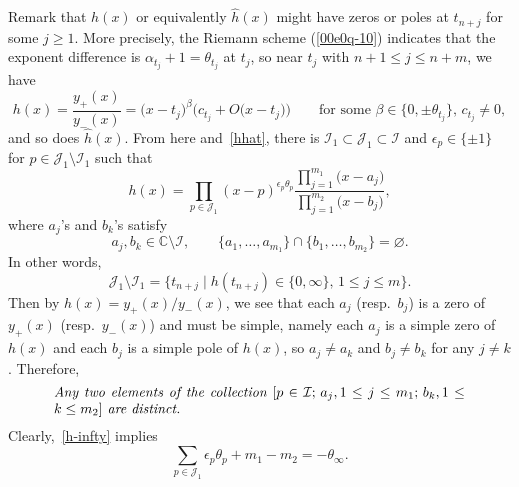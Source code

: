 \documentclass[pdftex]{sigma}
\numberwithin{equation}{section}
\begin{document}
Remark that $h(x)$ or equivalently $\hat{h}(x)$ might have zeros or
poles at $t_{n+j}$ for some $j\geq 1$. More precisely, the Riemann
scheme (\ref{00e0q-10}) indicates that the exponent difference is
$\alpha_{t_j}+1=\theta_{t_j}$ at $t_j$, so near $t_j$ with $n+1\leq
j\leq n+m$, we have
\[h(x)=\frac{y_{+}(x)}{y_{-}(x)}=\bigl(x-t_j\bigr)^{\beta}\bigl(c_{t_j}+O\bigl(x-t_j\bigr)\bigr) \qquad \text{for some $\beta\in\bigl\{0,\pm \theta_{t_j}\bigr\}$, $c_{t_j}\neq 0$},\]
and so does $\hat{h}(x)$. From here and~\eqref{hhat}, there is $\mathcal{I}_1\subset \mathcal{J}_1\subset \mathcal{I}$ and $\epsilon_p\in \{\pm 1\}$ for $p\in \mathcal{J}_1\setminus\mathcal{I}_1$ such that
\begin{equation}\label{00e0q-9}
h(x)=\prod_{p\in \mathcal{J}_1}(x-p)^{\epsilon_{p}\theta_{p}}
\frac{\prod_{j=1}^{m_1}\bigl(x-a_j\bigr)}{\prod_{j=1}^{m_2}\bigl(x-b_j\bigr)},
\end{equation}
where $a_j$'s and $b_k$'s satisfy
\begin{equation*}%
 a_j, b_k\in\mathbb{C}\setminus\mathcal{I},\qquad
 \{a_1,\dots, a_{m_1}\}\cap\{b_1,\dots, b_{m_2}\}=\varnothing.
\end{equation*}
In other words,
\[\mathcal{J}_1\setminus\mathcal{I}_1=\{t_{n+j}\mid h(t_{n+j})\in\{0,\infty\},\, 1\leq j\leq m\}.\]
Then by $h(x)=y_{+}(x)/y_{-}(x)$, we see that each $a_j$ (resp.\ $b_j$)
is a zero of $y_+(x)$ (resp.\ $y_-(x)$) and must be simple, namely each
$a_j$ is a simple zero of $h(x)$ and each $b_j$ is a simple pole of
$h(x)$, so $a_j\neq a_k$ and $b_j\neq b_k$ for any $j\neq
k$. Therefore,
\begin{equation*} %
 \parbox{\dimexpr\linewidth-5em}{\it
 Any two elements of the collection $[p\in\mathcal{I};\, a_j, 1\leq j\leq m_1;\, b_k, 1\leq k\leq m_2]$ are distinct. %
}
\end{equation*}
Clearly,~\eqref{h-infty} implies
\begin{equation}\label{00e0q-10-copy}\sum_{p\in \mathcal{J}_1}\epsilon_{p}\theta_{p}+m_1-m_2=-\theta_\infty.\end{equation}
\end{document}
